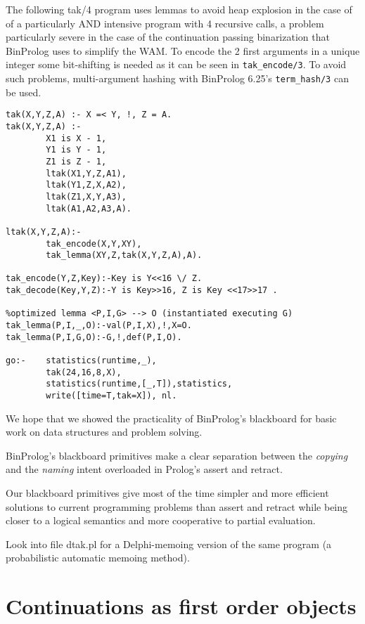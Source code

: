 \documentclass{article}
\begin{document}
The following tak/4 program uses lemmas to avoid heap explosion in the case of
of a particularly AND intensive program with 4 recursive calls, a problem particularly severe in the case of the continuation passing binarization that BinProlog uses to simplify the WAM. To encode the 2 first arguments in a unique integer some bit-shifting is needed as it can be seen in {\tt tak\_encode/3}. To avoid such problems, multi-argument hashing 
with BinProlog 6.25's {\tt term\_hash/3} can be used.

\begin{verbatim}
tak(X,Y,Z,A) :- X =< Y, !, Z = A.
tak(X,Y,Z,A) :-
        X1 is X - 1,    
        Y1 is Y - 1,    
        Z1 is Z - 1,    
        ltak(X1,Y,Z,A1), 
        ltak(Y1,Z,X,A2), 
        ltak(Z1,X,Y,A3), 
        ltak(A1,A2,A3,A).

ltak(X,Y,Z,A):-
        tak_encode(X,Y,XY),
        tak_lemma(XY,Z,tak(X,Y,Z,A),A).

tak_encode(Y,Z,Key):-Key is Y<<16 \/ Z.                
tak_decode(Key,Y,Z):-Y is Key>>16, Z is Key <<17>>17 .

%optimized lemma <P,I,G> --> O (instantiated executing G)
tak_lemma(P,I,_,O):-val(P,I,X),!,X=O.
tak_lemma(P,I,G,O):-G,!,def(P,I,O).

go:-    statistics(runtime,_), 
        tak(24,16,8,X),
        statistics(runtime,[_,T]),statistics, 
        write([time=T,tak=X]), nl.

\end{verbatim}

We hope that we showed the practicality of BinProlog's blackboard for basic
work on data structures and problem solving.

BinProlog's blackboard primitives make a clear separation between the {\em copying} and the {\em naming} intent overloaded in Prolog's assert and retract.

Our blackboard primitives give most of the time simpler and more efficient solutions to current programming problems than assert and retract while being closer to a logical semantics and more cooperative to partial evaluation.

Look into file dtak.pl for a Delphi-memoing version of the
same program (a probabilistic automatic memoing method).

\section{Continuations as first order objects}
\end{document}
